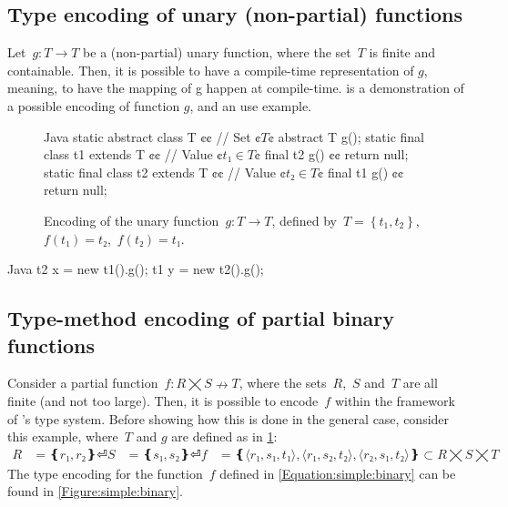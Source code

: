 \subsection{Type encoding of unary (non-partial) functions}
Let~$g: T \rightarrow T $ be a (non-partial) unary function,
  where the set~$T$ is finite and containable.
Then, it is possible to have a compile-time representation of $g$,
  meaning, to have the mapping of g happen at compile-time.  
 is a demonstration of a possible encoding
of function $g$, and an use example.  

\begin{figure}
  \begin{Code}{Java}
static abstract class T {¢¢ // Set ¢$T$¢
  abstract T g();
  static final class t1 extends T {¢¢ // Value ¢$t₁∈T$¢
    final t2 g() {¢¢ return null; }
  }
  static final class t2 extends T {¢¢ // Value ¢$t₂∈T$¢
    final t1 g() {¢¢ return null; }
  }
}
\end{Code}
  \caption{Encoding of the unary function~$g: T→T$,
  defined by~$T=\left\{ t_1,t_2 \right\}$,~$f(t₁)=t₂$,~$f(t₂)=t₁$.}
  \label{Figure:unary:function}
\end{figure}

\begin{code}{Java}
  t2 x = new t1().g();
  t1 y = new t2().g();
\end{code}

\subsection{Type-method encoding of partial binary functions}
Consider a partial function~$f: R⨉S↛T$,
  where the sets~$R$,~$S$ and~$T$ are all finite (and not too large).
Then, it is possible to encode~$f$ within the framework of \Java's type system.
Before showing how this is done in the general case, consider this example, 
where~$T$ and $g$ are defined as in \cref{Figure:unary:function}:
\begin{equation}
  \label{Equation:simple:binary}
\begin{split}
  R & = ❴ r₁, r₂❵⏎
  S & = ❴ s₁, s₂❵⏎
  f & = ❴ ⟨r₁, s₁, t₁⟩, ⟨r₁, s₂, t₂⟩, ⟨r₂, s₁, t₂⟩ ❵ ⊂R⨉S⨉T
\end{split}
\end{equation}
The \Java type encoding for the function~$f$ defined in \cref{Equation:simple:binary}
  can be found in \cref{Figure:simple:binary}.

\begin{figure}
  \begin{adjustbox}{max width=0.6\linewidth}
    
  \end{adjustbox}
\end{figure}

